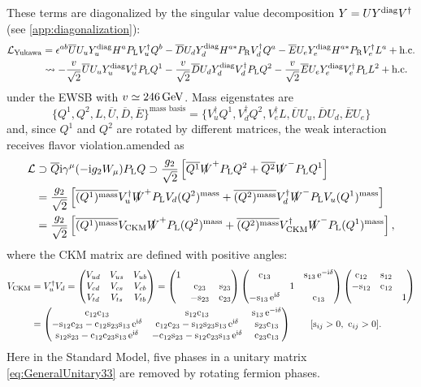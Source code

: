 \documentclass[CheatSheet]{subfiles}
\begin{document}
These terms are diagonalized by the singular value decomposition $Y=UY^{\mathrm{diag}} V^\dagger$ (see \cref{app:diagonalization}):
\begin{align}
\mathcal L_{\mathrm{Yukawa}}&=
  \epsilon^{ab}\overline{U}U_uY_{u}^{\mathrm{diag}} H^a P_{\mathrm{L}} V_u^\dagger Q^b
- \overline{D}U_dY_{d}^{\mathrm{diag}} H^{a*} P_{\mathrm{R}} V_d^\dagger Q^a
- \overline{E}U_eY_{e}^{\mathrm{diag}} H^{a*} P_{\mathrm{R}} V_e^\dagger L^a + \text{h.c.}
\\&\leadsto
  -\frac{v}{\sqrt2}\overline{U}U_uY_{u}^{\mathrm{diag}} V_u^\dagger P_{\mathrm{L}} Q^1
  -\frac{v}{\sqrt2}\overline{D}U_dY_{d}^{\mathrm{diag}} V_d^\dagger P_{\mathrm{L}} Q^2
  -\frac{v}{\sqrt2}\overline{E}U_eY_{e}^{\mathrm{diag}} V_e^\dagger P_{\mathrm{L}} L^2 + \text{h.c.}
\end{align}
under the EWSB with $v\simeq246\,\mathrm{GeV}$. Mass eigenstates are
\begin{equation}
 \{Q^1, Q^2, L, \overline U, \overline D, \overline E\}^\text{mass basis}
=
\{V_u^\dagger Q^1, V_d^\dagger Q^2, V_e^\dagger L,
  \overline UU_u, \overline DU_d, \overline EU_e
\}
\end{equation}
and, since $Q^1$ and $Q^2$ are rotated by different matrices, the weak interaction receives flavor violation.amended as
\begin{align}
 \mathcal L&\supset\overline{Q}\mathrm{i}\gamma^\mu(-\mathrm{i} g_2 W_\mu)P_{\mathrm{L}} Q
\supset
\frac{g_2}{\sqrt2}\left[
\overline{Q^1} \slashed W^+P_{\mathrm{L}} Q^2
+\overline{Q^2}\slashed W^-P_{\mathrm{L}} Q^1
\right]
\\&=
\frac{g_2}{\sqrt2}\left[
\overline{(Q^1)^{\text{mass}}} V_u^\dagger\slashed W^+P_{\mathrm{L}} V_d (Q^2)^{\text{mass}}
+\overline{(Q^2)^{\text{mass}}}V_d^\dagger\slashed W^-P_{\mathrm{L}} V_u (Q^1)^{\text{mass}}
\right]
\\&=
\frac{g_2}{\sqrt2}\left[
\overline{(Q^1)^{\text{mass}}} V_{\mathrm{CKM}}\slashed W^+P_{\mathrm{L}} (Q^2)^{\text{mass}}
+\overline{(Q^2)^{\text{mass}}}V_{\mathrm{CKM}}^\dagger \slashed W^-P_{\mathrm{L}}(Q^1)^{\text{mass}}
\right],
\end{align}
where the CKM matrix are defined with positive angles:
\begin{align}
  V\w{CKM}&=V_u^\dagger V_d
 =\pmat{
 V_{ud} & V_{us} & V_{ub}\\
 V_{cd} & V_{cs} & V_{cb}\\
 V_{td} & V_{ts} & V_{tb}
 }
 =
%
 \pmat{1&&\\&\co{23}&\si{23}\\&-\si{23}&\co{23}}
 \pmat{\co{13}&&\si{13}\ee^{-\ii\delta}\\&1&\\-\si{13}\ee^{\ii\delta}&&\co{13}}
 \pmat{\co{12}&\si{12}&\\-\si{12}&\co{12}&\\&&1}
%
 \\&=
 \pmat{
 \co{12} \co{13} & \si{12} \co{13} & \si{13} \ee^{-\ii\delta}\\
 -\si{12} \co{23} - \co{12} \si{23} \si{13} \ee^{\ii\delta}& \co{12} \co{23} - \si{12}\si{23}\si{13} \ee^{\ii\delta}& \si{23}\co{13}\\
  \si{12}\si{23} - \co{12} \co{23} \si{13}\ee^{\ii\delta} & -\co{12}\si{23}-\si{12}\co{23}\si{13}\ee^{\ii\delta} & \co{23} \co{13}
 }\qquad[\si{ij}>0,~\co{ij}>0].
\end{align}
Here in the Standard Model, five phases in a unitary matrix \eqref{eq:GeneralUnitary33} are removed by rotating fermion phases.
\end{document}
